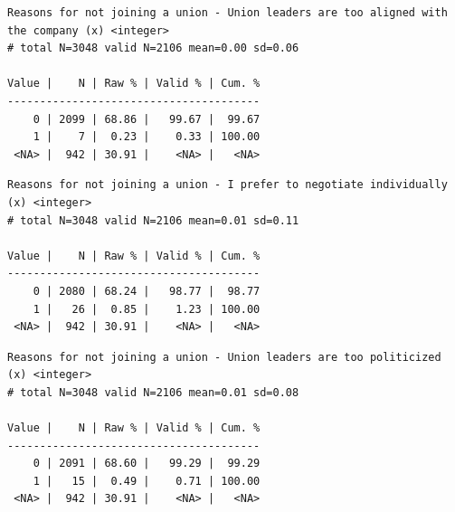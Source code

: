 \documentclass[
  letterpaper,
  DIV=11,
  numbers=noendperiod]{scrreprt}
\newenvironment{Shaded}{\begin{snugshade}}{\end{snugshade}}
\newcommand{\FunctionTok}[1]{\textcolor[rgb]{0.28,0.35,0.67}{#1}}
\newcommand{\NormalTok}[1]{\textcolor[rgb]{0.00,0.23,0.31}{#1}}
\newcommand{\SpecialCharTok}[1]{\textcolor[rgb]{0.37,0.37,0.37}{#1}}
\begin{document}
\begin{Shaded}
\end{Shaded}

\begin{verbatim}
Reasons for not joining a union - Union leaders are too aligned with the company (x) <integer> 
# total N=3048 valid N=2106 mean=0.00 sd=0.06

Value |    N | Raw % | Valid % | Cum. %
---------------------------------------
    0 | 2099 | 68.86 |   99.67 |  99.67
    1 |    7 |  0.23 |    0.33 | 100.00
 <NA> |  942 | 30.91 |    <NA> |   <NA>
\end{verbatim}

\begin{Shaded}
\end{Shaded}

\begin{verbatim}
Reasons for not joining a union - I prefer to negotiate individually (x) <integer> 
# total N=3048 valid N=2106 mean=0.01 sd=0.11

Value |    N | Raw % | Valid % | Cum. %
---------------------------------------
    0 | 2080 | 68.24 |   98.77 |  98.77
    1 |   26 |  0.85 |    1.23 | 100.00
 <NA> |  942 | 30.91 |    <NA> |   <NA>
\end{verbatim}

\begin{Shaded}
\end{Shaded}

\begin{verbatim}
Reasons for not joining a union - Union leaders are too politicized (x) <integer> 
# total N=3048 valid N=2106 mean=0.01 sd=0.08

Value |    N | Raw % | Valid % | Cum. %
---------------------------------------
    0 | 2091 | 68.60 |   99.29 |  99.29
    1 |   15 |  0.49 |    0.71 | 100.00
 <NA> |  942 | 30.91 |    <NA> |   <NA>
\end{verbatim}
\end{document}
